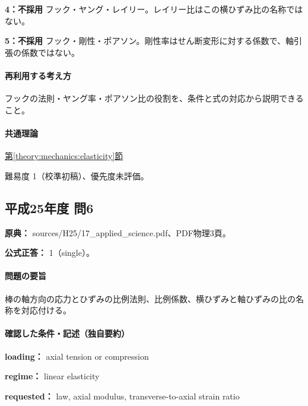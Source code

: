 \noindent\textbf{4：不採用} フック・ヤング・レイリー。レイリー比はこの横ひずみ比の名称ではない。\par

\noindent\textbf{5：不採用} フック・剛性・ポアソン。剛性率はせん断変形に対する係数で、軸引張の係数ではない。\par

\paragraph{再利用する考え方} フックの法則・ヤング率・ポアソン比の役割を、条件と式の対応から説明できること。

\paragraph{共通理論} \hyperref[theory:mechanics:elasticity]{第\ref*{theory:mechanics:elasticity}節}

\par 難易度 1（校準初稿）、優先度未評価。

\subsection{平成25年度 問6}
\label{q:h25-reg-applied-06}

\noindent\textbf{原典：} sources/H25/17\_applied\_science.pdf、PDF物理3頁。

\textbf{公式正答：} 1（single）。

\paragraph{問題の要旨} 棒の軸方向の応力とひずみの比例法則、比例係数、横ひずみと軸ひずみの比の名称を対応付ける。

\paragraph{確認した条件・記述（独自要約）}\mbox{}\par

\noindent\textbf{loading：} axial tension or compression\par

\noindent\textbf{regime：} linear elasticity\par

\noindent\textbf{requested：} law, axial modulus, transverse-to-axial strain ratio\par

